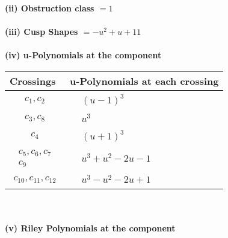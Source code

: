 \documentclass[1p]{elsarticle_modified}
\theoremstyle{definition}
\begin{document}
\flushleft \textbf{(ii) Obstruction class $= 1$}\\~\\
\flushleft \textbf{(iii) Cusp Shapes $= - u^2+u+11$}\\~\\
\newpage\renewcommand{\arraystretch}{1}
\flushleft \textbf{(iv) u-Polynomials at the component}\newline \\
\begin{tabular}{m{50pt}|m{274pt}}
Crossings & \hspace{64pt}u-Polynomials at each crossing \\
\hline $$\begin{aligned}c_{1},c_{2}\end{aligned}$$&$\begin{aligned}
&(u-1)^3
\end{aligned}$\\
\hline $$\begin{aligned}c_{3},c_{8}\end{aligned}$$&$\begin{aligned}
&u^3
\end{aligned}$\\
\hline $$\begin{aligned}c_{4}\end{aligned}$$&$\begin{aligned}
&(u+1)^3
\end{aligned}$\\
\hline $$\begin{aligned}c_{5},c_{6},c_{7}\\c_{9}\end{aligned}$$&$\begin{aligned}
&u^3+u^2-2 u-1
\end{aligned}$\\
\hline $$\begin{aligned}c_{10},c_{11},c_{12}\end{aligned}$$&$\begin{aligned}
&u^3- u^2-2 u+1
\end{aligned}$\\
\hline
\end{tabular}\\~\\
\newpage\renewcommand{\arraystretch}{1}
\flushleft \textbf{(v) Riley Polynomials at the component}\newline \\
\end{document}
